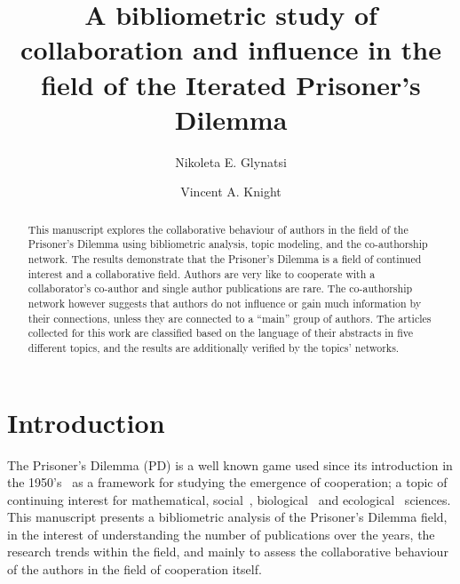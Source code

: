 \documentclass{article}
\title{A bibliometric study of collaboration and influence in the field of
the Iterated Prisoner's Dilemma}
\author[1]{Nikoleta E. Glynatsi}
\author[1]{Vincent A. Knight}
\affil[1]{Cardiff University, School of Mathematics, Cardiff, United Kingdom}
\date{}
\theoremstyle{definition}
\begin{document}
\maketitle

\begin{abstract}
This manuscript explores the collaborative behaviour of authors in the field
of the Prisoner's Dilemma using bibliometric analysis, topic modeling, and
the co-authorship network. The results demonstrate that the Prisoner's
Dilemma is a field of continued interest and  a collaborative field. Authors
are very like to cooperate with a collaborator's co-author and single author
publications are rare. The co-authorship network however suggests that
authors do not influence or gain much information by their connections,
unless they are connected to a ``main'' group of authors. The articles
collected for this work are classified based on the language of their
abstracts in five different topics, and the results are additionally verified by
the topics' networks.
\end{abstract}

\section{Introduction}\label{section:introduction}

The Prisoner's Dilemma (PD) is a well known game used since its introduction in the
1950's~\cite{Flood1958} as a framework for studying the emergence of
cooperation; a topic of continuing interest for mathematical,
social~\cite{Perc2008}, biological~\cite{Turner1999} and
ecological~\cite{Wu2011} sciences. This manuscript presents a bibliometric
analysis of the Prisoner's Dilemma field, in the interest of understanding the
number of publications over the years, the research trends within the
field, and mainly to assess the collaborative behaviour
of the authors in the field of cooperation itself.
\end{document}
